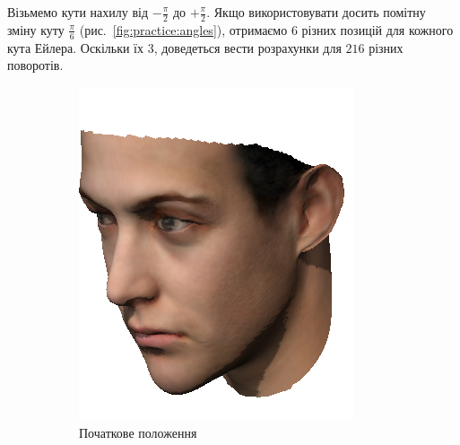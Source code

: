 Візьмемо кути нахилу від $-\frac{\pi}{2}$ до $+\frac{\pi}{2}$.
Якщо використовувати досить помітну зміну куту $\frac{\pi}{6}$
(рис.~\ref{fig:practice:angles}),
отримаємо $6$ різних позицій для кожного кута Ейлера.
Оскільки їх $3$, доведеться вести розрахунки для $216$ різних поворотів.
\begin{figure}[h]
  \centering
  \begin{subfigure}[b]{0.3\textwidth}
    \centering
    \includegraphics[width=\textwidth]{images/face_rotated_1}
    \caption{Початкове положення}
  \end{subfigure}
  \begin{subfigure}[b]{0.3\textwidth}
    \centering

\end{subfigure}
\end{figure}
